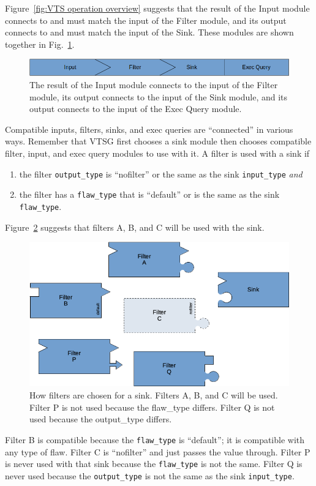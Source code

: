 \label{sec:connecting inputs, filters, and sinks}
Figure~\ref{fig:VTS operation overview} suggests that the result of the Input module
connects to and must match the input of the Filter module, and its output connects to
and must match the input of the Sink.  These modules are shown together in
Fig.~\ref{fig:input, filter, and sink}.
\begin{figure}[tbp]
  \centerline{\includegraphics[width=\linewidth]{fig_input_filter_sink.png}}
  \caption{The result of the Input module connects to the input of the Filter module,
    its output connects to the input of the Sink module, and its output connects
    to the input of the Exec Query module.
  }
  \label{fig:input, filter, and sink}
\end{figure}
Compatible inputs, filters, sinks, and exec queries are ``connected'' in various
ways.  Remember that
VTSG first chooses a sink module then chooses compatible filter, input, and exec
query modules to
use with it.
\label{sec:compatible modules}
A filter is used with a sink if
\begin{enumerate}[nosep]
\item the filter \verb|output_type| is ``nofilter'' or the same as the sink
  \verb|input_type| \emph{and}
\item the filter has a \verb|flaw_type| that is ``default'' or is the same as the
  sink \verb|flaw_type|.
\end{enumerate}
Figure~\ref{fig:how filters fit a sink} suggests that filters A, B, and C will
be used with the sink.
\begin{figure}[tbp]
  \centerline{\includegraphics[width=.8\linewidth]{fig_filters_and_sinks.png}}
  \caption{How filters are chosen for a sink.  Filters A, B, and C will be used.
    Filter P is not used because the flaw\_type differs.
    Filter Q is not used because the output\_type differs.
  }
  \label{fig:how filters fit a sink}
\end{figure}
Filter B is compatible because the \verb|flaw_type| is
``default''; it is compatible with any type of flaw.  Filter C is ``nofilter'' and
just passes the value through.  Filter P is never used with that sink because
the \verb|flaw_type| is not the same.
Filter Q is never used because the \verb|output_type| is not the same as the
sink \verb|input_type|.

